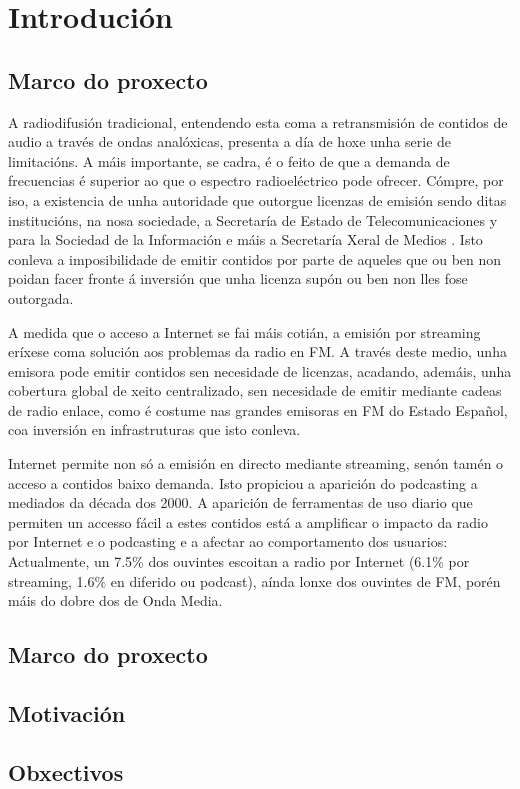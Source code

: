 \chapter[Introducción]{
  \label{chp:introduccion}
  Introdución
}
\minitoc
\newpage


\section{Marco do proxecto}

A radiodifusión tradicional, entendendo esta coma a retransmisión de contidos de audio a través de ondas analóxicas, presenta a día de hoxe unha serie de limitacións. A máis importante, se cadra, é o feito de que a demanda de frecuencias é superior ao que o espectro radioeléctrico pode ofrecer. Cómpre, por iso, a existencia de unha autoridade que outorgue licenzas de emisión sendo ditas institucións, na nosa sociedade, a Secretaría de Estado de Telecomunicaciones y para la Sociedad de la Información e máis a Secretaría Xeral de Medios \cite{ley_audiovisual}. Isto conleva a imposibilidade de emitir contidos por parte de aqueles que ou ben non poidan facer fronte á inversión que unha licenza supón ou ben non lles fose outorgada.

A medida que o acceso a Internet se fai máis cotián, a emisión por streaming eríxese coma solución aos problemas da radio en FM. A través deste medio, unha emisora pode emitir contidos sen necesidade de licenzas, acadando, ademáis, unha cobertura global de xeito centralizado, sen necesidade de emitir mediante cadeas de radio enlace, como é costume nas grandes emisoras en FM do Estado Español, coa inversión en infrastruturas que isto conleva.

Internet permite non só a emisión en directo mediante streaming, senón tamén o acceso a contidos baixo demanda. Isto propiciou a aparición do podcasting a mediados da década dos 2000. A aparición de ferramentas de uso diario que permiten un accesso fácil a estes contidos está a amplificar o impacto da radio por Internet e o podcasting e a afectar ao comportamento dos usuarios: Actualmente, un 7.5\% dos ouvintes escoitan a radio por Internet (6.1\% por streaming, 1.6\% en diferido ou podcast), aínda lonxe dos ouvintes de FM, porén máis do dobre dos de Onda Media.





\section{Marco do proxecto}

\section{Motivación}

\section{Obxectivos}
